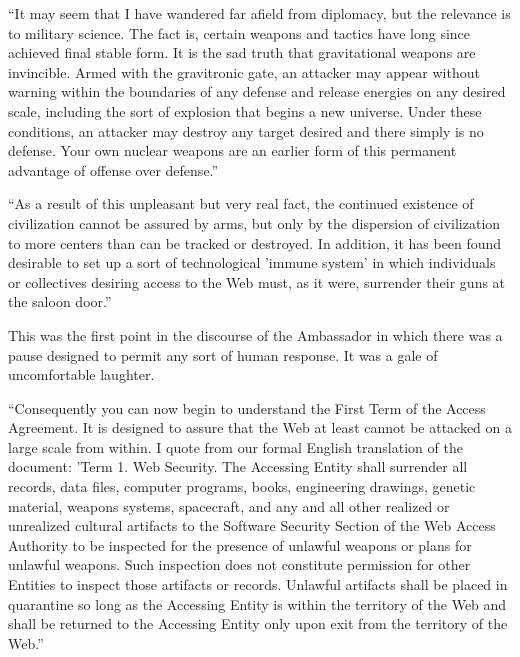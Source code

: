 \documentclass[english,11pt,letterpaper,onecolumn]{scrbook}
\begin{document}
	``It may seem that I have wandered far afield from diplomacy, but the relevance is to military science.  The fact is, certain weapons and tactics have long since achieved final stable form.  It is the sad truth that gravitational weapons are invincible.  Armed with the gravitronic gate, an attacker may appear without warning within the boundaries of any defense and release energies on any desired scale, including the sort of explosion that begins a new universe.  Under these conditions, an attacker may destroy any target desired and there simply is no defense.  Your own nuclear weapons are an earlier form of this permanent advantage of offense over defense.''
	
	``As a result of this unpleasant but very real fact, the continued existence of civilization cannot be assured by arms, but only by the dispersion of civilization to more centers than can be tracked or destroyed.  In addition, it has been found desirable to set up a sort of technological 'immune system' in which individuals or collectives desiring access to the Web must, as it were, surrender their guns at the saloon door.''
	
	This was the first point in the discourse of the Ambassador in which there was a pause designed to permit any sort of human response.  It was a gale of uncomfortable laughter.
	
	``Consequently you can now begin to understand the First Term of the Access Agreement.  It is designed to assure that the Web at least cannot be attacked on a large scale from within.  I quote from our formal English translation of the document:  'Term 1.  Web Security.  The Accessing Entity shall surrender all records, data files, computer programs, books, engineering drawings, genetic material, weapons systems, spacecraft, and any and all other realized or unrealized cultural artifacts to the Software Security Section of the Web Access Authority to be inspected for the presence of unlawful weapons or plans for unlawful weapons.  Such inspection does not constitute permission for other Entities to inspect those artifacts or records.  Unlawful artifacts shall be placed in quarantine so long as the Accessing Entity is within the territory of the Web and shall be returned to the Accessing Entity only upon exit from the territory of the Web.''
	
\end{document}
